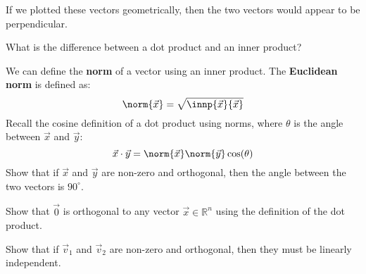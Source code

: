 If we plotted these vectors geometrically, then the two vectors would appear to be perpendicular.
\begin{enumerate}
  \qitem What is the difference between a dot product and an inner product?
  


  \qitem We can define the \textbf{norm} of a vector using an inner product. 
  The \textbf{Euclidean norm} is defined as:
  \begin{equation}
    \norm{\vec{x}} = \sqrt{\innp{\vec{x}}{\vec{x}}}
  \end{equation}
  Recall the cosine definition of a dot product using norms, where $\theta$ is the angle between $\vec{x}$ and $\vec{y}$:
  \begin{equation}
    \vec{x} \cdot \vec{y} = \norm{\vec{x}} \norm{\vec{y}} \cos(\theta)
  \end{equation}
  Show that if $\vec{x}$ and $\vec{y}$ are non-zero and orthogonal, then the angle between the two vectors is $90^{\circ}.$


  \qitem Show that $\vec{0}$ is orthogonal to any vector $\vec{x} \in \mathbb{R}^{n}$ using the definition of the dot product.


  \qitem Show that if $\vec{v}_{1}$ and $\vec{v}_{2}$ are non-zero and orthogonal, then they must be linearly independent.


\end{enumerate}
